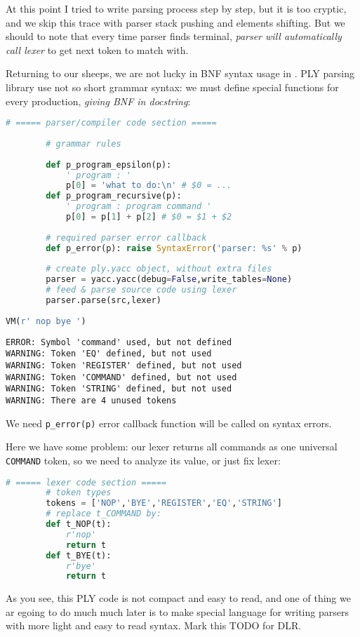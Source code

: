 \bigskip
At this point I tried to write parsing process step by step, but it is too
cryptic, and we skip this trace with parser stack pushing and elements shifting.
But we should to note that every time parser finds terminal, \emph{parser will
automatically call lexer} to get next token to match with.

\clearpage
Returning to our sheeps, we are not lucky in BNF syntax usage in \py.
PLY parsing library use not so short grammar syntax: we must define special
functions for every production, \emph{giving BNF in docstring}:
\begin{lstlisting}[language=python]
		# ===== parser/compiler code section =====
		
		# grammar rules
		
		def p_program_epsilon(p):
			' program : '
			p[0] = 'what to do:\n' # $0 = ...
		def p_program_recursive(p):
			' program : program command '
			p[0] = p[1] + p[2] # $0 = $1 + $2
			
		# required parser error callback
		def p_error(p): raise SyntaxError('parser: %s' % p)
		
		# create ply.yacc object, without extra files
		parser = yacc.yacc(debug=False,write_tables=None)
		# feed & parse source code using lexer
		parser.parse(src,lexer)				
		
VM(r' nop bye ')
\end{lstlisting}
\begin{lstlisting}
ERROR: Symbol 'command' used, but not defined
WARNING: Token 'EQ' defined, but not used
WARNING: Token 'REGISTER' defined, but not used
WARNING: Token 'COMMAND' defined, but not used
WARNING: Token 'STRING' defined, but not used
WARNING: There are 4 unused tokens
\end{lstlisting}
We need \verb|p_error(p)| error callback function will be called on syntax
errors.

\clearpage
Here we have some problem: our lexer returns all commands as one universal
\verb|COMMAND| token, so we need to analyze its value, or just fix lexer:
\begin{lstlisting}[language=python]
		# ===== lexer code section =====
		# token types
		tokens = ['NOP','BYE','REGISTER','EQ','STRING']
		# replace t_COMMAND by:
		def t_NOP(t):
			r'nop'
			return t
		def t_BYE(t):
			r'bye'
			return t
\end{lstlisting}
 
As you see, this PLY code is not compact and easy to read, and one of thing we
ar egoing to do much much later is to make special language for writing parsers
with more light and easy to read syntax. Mark this TODO for DLR.
